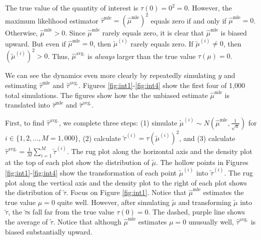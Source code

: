 \documentclass[10pt]{article}
\begin{document}
The true value of the quantity of interest is $\tau(0) = 0^2 = 0$. 
However, the maximum likelihood estimator $\hat{\tau}^\text{mle} = \left( \hat{\mu}^\text{mle} \right)^2$ equals zero if and only if $\hat{\mu}^\text{mle} = 0$. 
Otherwise, $\hat{\mu}^\text{mle} > 0$. 
Since $\hat{\mu}^\text{mle}$ rarely equals zero, it is clear that $\hat{\mu}^\text{mle}$ is biased upward. 
But even if $\hat{\mu}^\text{mle} = 0$, then $\tilde{\mu}^{(i)}$ rarely equals zero. If $\tilde{\mu}^{(i)} \neq 0$, then $\left( \tilde{\mu}^{(i)} \right)^2 > 0$. 
Thus, $\hat{\mu}^\text{avg.}$ is \emph{always} larger than the true value $\tau(\mu) = 0$.

We can see the dynamics even more clearly by repeatedly simulating $y$ and estimating $\hat{\tau}^\text{mle}$ and $\hat{\tau}^\text{avg.}$. 
Figures \ref{fig:int1}-\ref{fig:int4} show the first four of 1,000 total simulations. 
The figures show how the the unbiased estimate $\hat{\mu}^\text{mle}$ is translated into $\hat{\tau}^\text{mle}$ and $\hat{\tau}^\text{avg.}$. 

First, to find $\hat{\tau}^\text{avg.}$, we complete three steps: (1) simulate $\tilde{\mu}^{(i)} \sim N \left( \hat{\mu}^\text{mle}, \frac{1}{\sqrt{n}} \right)$ for $i \in \{1, 2, ... , M = 1,000\}$, (2) calculate $\tilde{\tau}^{(i)} = \tau\left( \tilde{\mu}^{(i)} \right)^2$, and (3) calculate $\hat{\tau}^\text{avg.} = \frac{1}{M} \sum_{i = 1}^M \tilde{\tau}^{(i)}$.
The rug plot along the horizontal axis and the density plot at the top of each plot show the distribution of $\tilde{\mu}$. 
The hollow points in Figures \ref{fig:int1}-\ref{fig:int4} show the transformation of each point $\tilde{\mu}^{(i)}$ into $\tilde{\tau}^{(i)}$. 
The rug plot along the vertical axis and the density plot to the right of each plot shows the distribution of $\tilde{\tau}$. 
Focus on Figure \ref{fig:int1}. Notice that $\hat{\mu}^\text{mle}$ estimates the true value $\mu = 0$ quite well. 
However, after simulating $\tilde{\mu}$ and transforming $\tilde{\mu}$ into $\tilde{\tau}$, the $\tilde{\tau}$s fall far from the true value $\tau(0) = 0$. 
The dashed, purple line shows the average of $\tilde{\tau}$. 
Notice that although $\hat{\mu}^\text{mle}$ estimates $\mu = 0$ unusually well, $\hat{\tau}^\text{avg.}$ is biased substantially upward.
\end{document}

